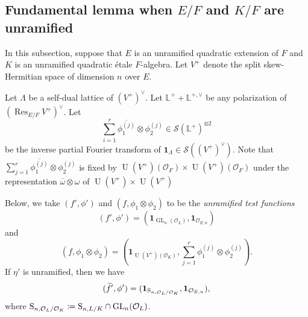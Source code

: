 \documentclass[11pt, reqno]{amsart}
\numberwithin{equation}{subsection}
\theoremstyle{plain}
\theoremstyle{definition}
\newcommand{\LL}{\mathbb L}
\renewcommand{\O}{\mathcal O}
\newcommand{\ol}{\overline}
\renewcommand{\S}{\textnormal{S}}
\newcommand{\cS}{\mathcal S}
\DeclareMathOperator{\GL}{GL}
\DeclareMathOperator{\Res}{Res}
\DeclareMathOperator{\U}{U}
\begin{document}
\subsection{Fundamental lemma when $E/F$ and $K/F$ are unramified}
\label{sec:FL}
In this subsection, suppose that $E$ is an unramified 
quadratic extension of  $F$ and $K$ is an unramified 
quadratic \'etale  $F$-algebra. 
Let $V^+$ denote the split skew-Hermitian space of dimension
$n$ over $E$. 

Let $\Lambda$ be a self-dual lattice of $(V^+)^\vee$.
Let $\LL^+ + \LL^{+, \vee}$ be any polarization of
$(\Res_{E/F} V^+)^\vee$. Let 
\[
    \sum_{i=1}^r \ol{\phi_1^{(j)}}\otimes \phi_2^{(j)} 
\in \cS(\LL^+)^{\otimes 2}
\]
be the inverse partial Fourier transform of
$\mathbf{1}_{\Lambda} \in \cS((V^+)^\vee)$. 
Note that $\sum_{j=1}^r \ol{\phi_1^{(j)}}
\otimes \phi_2^{(j)}$ is fixed by 
$\U(V^+)(\O_F) \times \U(V^+)(\O_F)$ under the
representation $\ol{\omega}\otimes \omega$ of
$\U(V^+) \times \U(V^+)$

Below, we take $(f', \phi')$ and $(f, \phi_1 \otimes \phi_2)$
to be the \emph{unramified test functions}
\[
    (f', \phi') = (\mathbf{1}_{\GL_n(\O_L)}, \mathbf{1}_{\O_{E,n}})
\]
and
\[
    (f, \phi_1 \otimes \phi_2) =
    \left(\mathbf{1}_{\U(V^+)(\O_K)}, \sum_{j=1}^r
    \phi_1^{(j)} \otimes \phi_2^{(j)}\right).
\]
If $\eta'$ is unramified, then we have
\[
    (\widetilde f', \phi') = (\mathbf{1}_{\S_{n,\O_L/\O_K}},
    \mathbf{1}_{\O_{E,n}}),
\]
where $\S_{n,\O_L/\O_K} \coloneqq \S_{n, L/K}
\cap \GL_n(\O_L)$.
\end{document}
